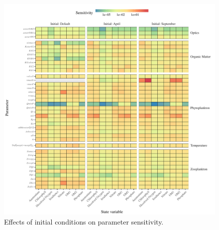 \documentclass[letterpaper,12pt,oneside]{article}\usepackage[]{graphicx}\usepackage[]{color}
\begin{document}
\begin{figure}[!ht]

{\centering \includegraphics[width=\textwidth]{figs/inieval-1} 

}

\caption[Effects of initial conditions on parameter sensitivity]{Effects of initial conditions on parameter sensitivity.}\label{fig:inieval}
\end{figure}
\end{document}
